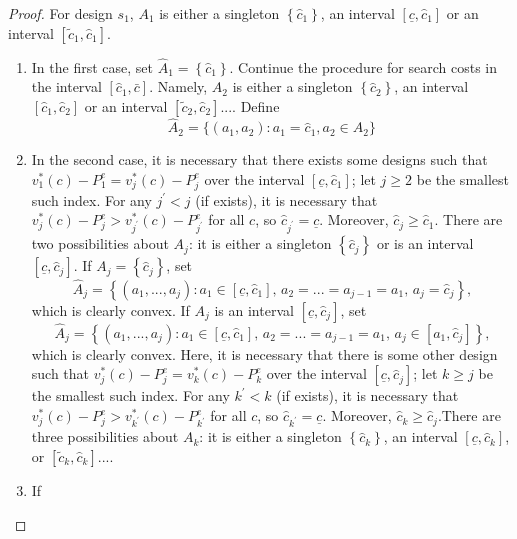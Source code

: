\documentclass[14pt]{article}
\theoremstyle{plain}
\theoremstyle{definition}
\theoremstyle{remark}
\DeclareRobustCommand\1{\futurelet\oneNext\oneCheck}
\begin{document}
\begin{proof}
For design $s_{1}$, $A_1$ is either a singleton $\left\{ \hat{c}%
_{1}\right\} $,  an interval $\left[ \underline{c},\hat{c}_{1}%
\right] $ or an interval $[\tilde{c}_1, \hat{c}_1]$.
\begin{enumerate}
    \item In the first case, set $\hat{A}_{1}=\left\{ \hat{c}_{1}\right\} $. Continue the procedure for search costs in the interval $\left[ \hat{c}_{1},\bar{c}%
    \right] $. Namely, $A_{2}$ is either a singleton $\left\{ \hat{c}%
    _{2}\right\} $, an interval $\left[ \hat{c}_{1},\hat{c}_{2}\right] $ or an interval $[\tilde{c}_2, \hat{c}_2]$....
    Define 
    \[
    \hat{A}_2 = \{(a_1, a_2): a_1 =\hat{c}_1, a_2\in A_2\}
    \]
    \item In the second case, it is necessary that there exists some designs such that $v_{1}^{\ast }\left( c\right) -P_{1}^{e}=v_{j}^{\ast }\left( c\right)
    -P_{j}^{e}$ over the interval $\left[ \underline{c},\hat{c}_{1}\right] $;
    let $j\geq 2$ be the smallest such index.  For any $j^{\prime }<j$ (if
    exists), it is necessary that $v_{j}^{\ast }\left( c\right)
    -P_{j}^{e}>v_{j^{\prime }}^{\ast }\left( c\right) -P_{j^{\prime }}^{e}$ for
    all $c$, so $\hat{c}_{j^{\prime }}=\underline{c}$. Moreover, $\hat{c}%
    _{j}\geq \hat{c}_{1}$. There are two possibilities about $A_{j}$: it is
    either a singleton $\left\{ \hat{c}_{j}\right\} $ or is an interval $\left[ 
    \underline{c},\hat{c}_{j}\right] $. If $A_{j}=\left\{ \hat{c}_{j}\right\} $,
    set 
    \begin{equation*}
    \hat{A}_{j}=\left\{ \left( a_{1},...,a_{j}\right) :a_{1}\in \left[ 
    \underline{c},\hat{c}_{1}\right] \text{, }a_{2}=...=a_{j-1}=a_{1}\text{, }%
    a_{j}=\hat{c}_{j}\right\} \text{,}
    \end{equation*}%
    which is clearly convex. 
    If $A_{j}$ is an interval $\left[ \underline{c},\hat{c}_{j}\right] $, set  
    \begin{equation*}
    \hat{A}_{j}=\left\{ \left( a_{1},...,a_{j}\right) :a_{1}\in \left[ 
    \underline{c},\hat{c}_{1}\right] \text{, }a_{2}=...=a_{j-1}=a_{1}\text{, }%
    a_{j}\in \left[ a_{1},\hat{c}_{j}\right] \right\} \text{,}
    \end{equation*}%
    which is clearly convex. Here, it is necessary that there is some other design such that $v_{j}^{\ast }\left( c\right) -P_{j}^{e}=v_{k}^{\ast
}\left( c\right) -P_{k}^{e}$ over the interval $\left[ \underline{c},\hat{c}%
_{j}\right] $; let $k\geq j$ be the smallest such index. For any $k^{\prime
}<k$ (if exists), it is necessary that $v_{j}^{\ast }\left( c\right)
-P_{j}^{e}>v_{k^{\prime }}^{\ast }\left( c\right) -P_{k^{\prime }}^{e}$ for
all $c$, so $\hat{c}_{k^{\prime }}=\underline{c}$. Moreover, $\hat{c}%
_{k}\geq \hat{c}_{j}$.There are three possibilities about $A_{k}$: it is
either a singleton $\left\{ \hat{c}_{k}\right\} $,  an interval $\left[ 
\underline{c},\hat{c}_{k}\right] $, or $[\tilde{c}_k, \hat{c}_k]$....
   \item If 
\end{enumerate}


\end{proof}
\end{document}
